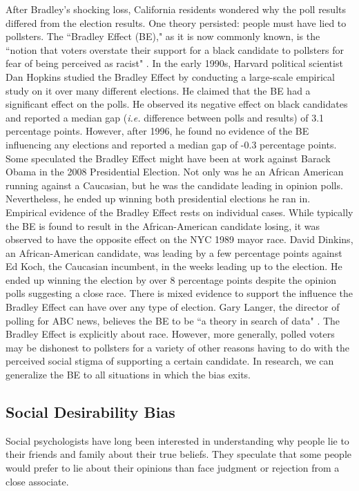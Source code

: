 After Bradley's shocking loss, California residents wondered why the poll
results differed from the election results. One theory persisted: people must
have lied to pollsters. The ``Bradley Effect (BE)," as it is now commonly
known, is the ``notion that voters overstate their support for a black
candidate to pollsters for fear of being perceived as racist"
\citep{daprile_shattering_2008}. In the early 1990s, Harvard political
scientist Dan Hopkins studied the Bradley Effect by conducting a large-scale
empirical study on it over many different elections. He claimed that the BE
had a significant effect on the polls. He observed its negative effect on
black candidates and reported a median gap (\textit{i.e.} difference between
polls and results) of 3.1 percentage points. However, after 1996, he found no
evidence of the BE influencing any elections and reported a median gap of -0.3
percentage points. Some speculated the Bradley Effect might have been at work
against Barack Obama in the 2008 Presidential Election. Not only was he an
African American running against a Caucasian, but he was the candidate leading
in opinion polls. Nevertheless, he ended up winning both presidential
elections he ran in. Empirical evidence of the Bradley Effect rests on
individual cases. While typically the BE is found to result in the
African-American candidate losing, it was observed to have the opposite effect
on the NYC 1989 mayor race. David Dinkins, an African-American candidate, was
leading by a few percentage points against Ed Koch, the Caucasian incumbent,
in the weeks leading up to the election. He ended up winning the election by
over 8 percentage points despite the opinion polls suggesting a close race.
There is mixed evidence to support the influence the Bradley Effect can have
over any type of election. Gary Langer, the director of polling for ABC news,
believes the BE to be ``a theory in search of data"
\citep{wang_disappearing_2008}. The Bradley
Effect is explicitly about race. However, more generally, polled voters may be
dishonest to pollsters for a variety of other reasons having to do with the
perceived social stigma of supporting a certain candidate. In research, we can
generalize the BE to all situations in which the bias exits.


\subsection{Social Desirability Bias}
        
Social psychologists have long been interested in understanding why people lie to their friends and family about their true beliefs. They speculate that some people would prefer to lie about their opinions than face judgment or rejection from a close associate.


